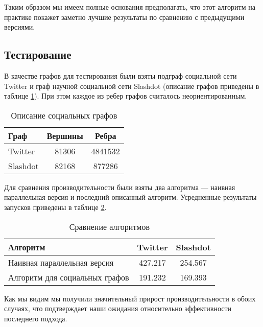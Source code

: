 Таким образом мы имеем полные основания предполагать, что этот алгоритм на практике покажет заметно лучшие результаты по сравнению с предыдущими версиями. 

\FloatBarrier
\subsection{Тестирование}

В качестве графов для тестирования были взяты подграф социальной сети Twitter и граф научной социальной сети Slashdot (описание графов приведены в таблице \ref{table:algo_floyd_graph_description}). При этом каждое из ребер графов считалось неориентированным. \FloatBarrier
\begin{table}[H]
\centering
\caption{Описание социальных графов}

\begin{tabular}{l|c|c} 
\hline 
Граф & Вершины & Ребра\\
\hline\hline
Twitter & 81306 & 4841532\\  
Slashdot & 82168 & 877286  \\
\hline
\end{tabular}

\label {table:algo_floyd_graph_description}
\end{table}

\FloatBarrier

Для сравнения производительности были взяты два алгоритма --- наивная параллельная версия и последний описанный алгоритм. Усредненные результаты запусков приведены в таблице \ref{table:algo_floyd_comparison}.   


\FloatBarrier
\begin{table}[H]
\centering
\caption{Сравнение алгоритмов}

\begin{tabular}{l|c|c} 
\hline 
Алгоритм & Twitter & Slashdot\\
\hline\hline
Наивная параллельная версия & 427.217 & 254.567 \\  
Алгоритм для социальных графов & 191.232 & 169.393  \\
\hline
\end{tabular}

\label {table:algo_floyd_comparison}
\end{table}
\FloatBarrier

Как мы видим мы получили значительный прирост производительности в обоих случаях, что подтверждает наши ожидания относительно эффективности последнего подхода.

